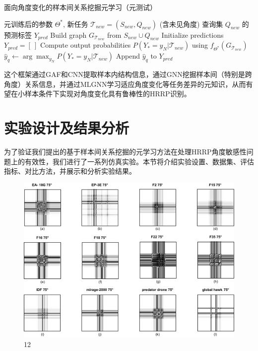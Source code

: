 \begin{algorithm}[htbp]
\caption{面向角度变化的样本间关系挖掘元学习（元测试）}
\label{alg:meta_testing_angle}
\begin{algorithmic}[1]
    \REQUIRE 元训练后的参数 $\Theta^*$, 新任务 $\mathcal{T}_{new} = (S_{new}, Q_{new})$ (含未见角度)
    \ENSURE 查询集 $Q_{new}$ 的预测标签 $Y_{pred}$
    \STATE Build graph $G_{\mathcal{T}_{new}}$ from $S_{new} \cup Q_{new}$
    \STATE Initialize predictions $Y_{pred} = [~]$
        \STATE Compute output probabilities $P(Y_* = y_N | \mathcal{T}_{new})$ using $f_{\Theta^*}(G_{\mathcal{T}_{new}})$ %
        \STATE $\hat{y}_q \leftarrow \arg\max_{y_N} P(Y_* = y_N | \mathcal{T}_{new})$
        \STATE Append $\hat{y}_q$ to $Y_{pred}$
    \ENDFOR
\end{algorithmic}
\end{algorithm}

这个框架通过GAF和CNN提取样本内结构信息，通过GNN挖掘样本间（特别是跨角度）关系信息，并通过MLGNN学习适应角度变化等任务差异的元知识，从而有望在小样本条件下实现对角度变化具有鲁棒性的HRRP识别。

\section{实验设计及结果分析}
\label{sec:experiments_angle}

为了验证我们提出的基于样本间关系挖掘的元学习方法在处理HRRP角度敏感性问题上的有效性，我们进行了一系列仿真实验。本节将介绍实验设置、数据集、评估指标、对比方法，并展示和分析实验结果。


\begin{figure}[!h]
\centering
\includegraphics[width=0.95\linewidth]{figures/gaf_samples.pdf} %
\caption{12}
\label{Fig_10}
\end{figure}


